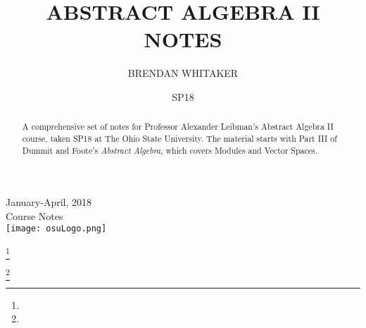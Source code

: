 \documentclass[12pt]{amsbook}
\theoremstyle{plain}
\numberwithin{section}{chapter}
\numberwithin{equation}{chapter}
\theoremstyle{definition}
\theoremstyle{remark}
\theoremstyle{plain}
\begin{document}
\begin{titlepage}


{\large January-April, 2018 \\Course Notes}\\[1cm] %


\vspace{15mm}
\texttt{[image: osuLogo.png]}\\[1cm] %
 

\vfill %

\end{titlepage}


\title{ABSTRACT ALGEBRA II NOTES}


\author{BRENDAN WHITAKER}
\address{}
\curraddr{}
\email{}
\thanks{}

\author{}
\address{}
\curraddr{}
\email{}
\thanks{}


\keywords{}

\date{SP18}

\begin{abstract}
A comprehensive set of notes for Professor Alexander Leibman's Abstract Algebra II course, taken SP18 at The Ohio State University. The material starts with Part III of Dummit and Foote's \textit{Abstract Algebra}, which covers Modules and Vector Spaces. 
\end{abstract}
\end{document}
